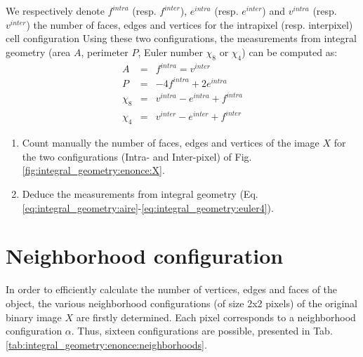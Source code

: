 We respectively denote $f^{intra}$ (resp. $f^{inter}$), $e^{intra}$ (resp. $e^{inter}$) and $v^{intra}$ (resp. $v^{inter}$) the number of faces, edges and vertices for the intrapixel (resp. interpixel) cell configuration
Using these two configurations, the measurements from integral geometry (area $A$, perimeter $P$, Euler number $\chi_8$ or $\chi_4$) can be computed as:\vspace*{-5pt}
\begin{eqnarray}
A&=&f^{intra}=v^{inter}\label{eq:integral_geometry:aire}\\
P&=&-4f^{intra}+2e^{intra}\\
\chi_8&=&v^{intra}-e^{intra}+f^{intra}\\
\chi_4&=&v^{inter}-e^{inter}+f^{inter}\label{eq:integral_geometry:euler4}
\end{eqnarray}

\begin{qbox}
\begin{enumerate}
	\item Count manually the number of faces, edges and vertices of the image $X$ for the two configurations (Intra- and Inter-pixel) of Fig. \ref{fig:integral_geometry:enonce:X}.
	\item Deduce the measurements from integral geometry (Eq. \ref{eq:integral_geometry:aire}-\ref{eq:integral_geometry:euler4}).
\end{enumerate}	
\end{qbox}
\vspace*{-5pt}
\section{Neighborhood configuration}\vspace*{-5pt}
In order to efficiently calculate the number of vertices, edges and faces of the object, the various neighborhood configurations (of size 2x2 pixels) of the original binary image $X$ are firstly determined. Each pixel corresponds to a neighborhood configuration $\alpha$. Thus, sixteen configurations are possible, presented in Tab. \ref{tab:integral_geometry:enonce:neighborhoods}.


